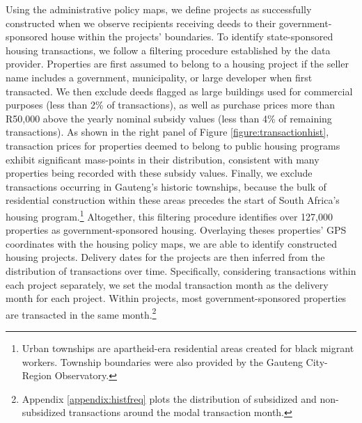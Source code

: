 \documentclass[12pt]{article}
\begin{document}
 Using the administrative policy maps, we define projects as successfully constructed when we observe recipients receiving deeds to their government-sponsored house within the projects' boundaries. To identify state-sponsored housing transactions, we follow a filtering procedure established by the data provider. Properties are first assumed to belong to a housing project if the seller name includes a government, municipality, or large developer when first transacted. 
 We then exclude deeds flagged as large buildings used for commercial purposes (less than 2\% of transactions), as well as purchase prices more than R50,000 above the yearly nominal subsidy values (less than 4\% of remaining transactions). As shown in the right panel of Figure \ref{figure:transactionhist}, transaction prices for properties deemed to belong to public housing programs exhibit significant mass-points in their distribution, consistent with many properties being recorded with these subsidy values. Finally, we exclude transactions occurring in Gauteng's historic townships, because the bulk of residential construction within these areas precedes the start of South Africa's housing program.\footnote{Urban townships are apartheid-era residential areas created for black migrant workers. Township boundaries were also provided by the Gauteng City-Region Observatory.} Altogether, this filtering procedure identifies over 127,000 properties as government-sponsored housing. Overlaying theses properties' GPS coordinates with the housing policy maps, we are able to identify constructed housing projects. Delivery dates for the projects are then inferred from the distribution of transactions over time. Specifically, considering transactions within each project separately, we set the modal transaction month as the delivery month for each project. Within projects, most government-sponsored properties are transacted in the same month.\footnote{Appendix \ref{appendix:histfreq} plots the distribution of subsidized and non-subsidized transactions around the modal transaction month.} %
\end{document}
